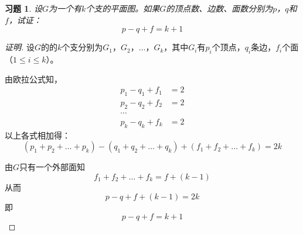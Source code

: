 \documentclass{article}
\begin{document}
\begin{CJK}{UTF8}{gbsn}
  \newtheorem*{Exercise}{习题}
\begin{Exercise}
  设$G$为一个有$k$个支的平面图。如果$G$的顶点数、边数、面数分别为$p$，$q$和$f$，试证：
  \[p-q+f=k+1\]
\end{Exercise}
\begin{proof}[证明]
  设$G$的的$k$个支分别为$G_1$，$G_2$，$\ldots$，$G_k$，其中$G_i$有$p_i$个顶点，$q_i$条边，$f_i$个面（$1\leq i \leq k$）。

  由欧拉公式知，
  \begin{align*}
    p_1-q_1+f_1&=2\\
    p_2-q_2+f_2&=2\\
    \cdots&\\
    p_k-q_k+f_k&=2
  \end{align*}
  以上各式相加得：
  \[(p_1+p_2+\ldots+p_k)-(q_1+q_2+\ldots+q_k)+(f_1+f_2+\ldots+f_k)=2k\]

由$G$只有一个外部面知
\[f_1 + f_2 + \ldots + f_k = f + (k-1)\]
从而
\[p-q+f+(k-1)=2k\]
即
\[p-q+f = k + 1\]
\end{proof}

\end{CJK}
\end{document}
